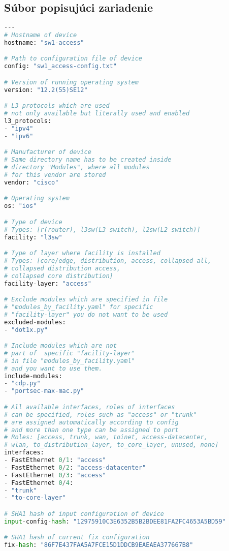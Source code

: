 \subsection{Súbor popisujúci zariadenie}
\begin{lstlisting}[frame=single,numbers=right,caption={Konfiguračný súbor device.yaml ktorý popisuje základné informácie o~jednom konkrétnom zariadení},label=lst:lldp,basicstyle=\ttfamily\small, keywordstyle=\color{black},language=python,breaklines=true]
---
# Hostname of device
hostname: "sw1-access"

# Path to configuration file of device
config: "sw1_access-config.txt"

# Version of running operating system
version: "12.2(55)SE12"

# L3 protocols which are used 
# not only available but literally used and enabled
l3_protocols:
- "ipv4"
- "ipv6"

# Manufacturer of device
# Same directory name has to be created inside 
# directory "Modules", where all modules 
# for this vendor are stored
vendor: "cisco"

# Operating system
os: "ios"

# Type of device
# Types: [r(router), l3sw(L3 switch), l2sw(L2 switch)]
facility: "l3sw"

# Type of layer where facility is installed
# Types: [core/edge, distribution, access, collapsed all, 
# collapsed distribution access, 
# collapsed core distribution]
facility-layer: "access"

# Exclude modules which are specified in file 
# "modules_by_facility.yaml" for specific 
# "facility-layer" you do not want to be used
excluded-modules:
- "dot1x.py"

# Include modules which are not 
# part of  specific "facility-layer"
# in file "modules_by_facility.yaml" 
# and you want to use them.
include-modules: 
- "cdp.py"
- "portsec-max-mac.py"

# All available interfaces, roles of interfaces
# can be specified, roles such as "access" or "trunk"
# are assigned automatically according to config 
# and more than one type can be assigned to port
# Roles: [access, trunk, wan, toinet, access-datacenter,
# wlan, to_distribution_layer, to_core_layer, unused, none]   
interfaces:
- FastEthernet 0/1: "access"
- FastEthernet 0/2: "access-datacenter"
- FastEthernet 0/3: "access"
- FastEthernet 0/4: 
- "trunk"
- "to-core-layer"

# SHA1 hash of input configuration of device
input-config-hash: "12975910C3E6352B5B2BDEE81FA2FC4653A5BD59"

# SHA1 hash of current fix configuration 
fix-hash: "86F7E437FAA5A7FCE15D1DDCB9EAEAEA377667B8"

\end{lstlisting}
 \newpage
